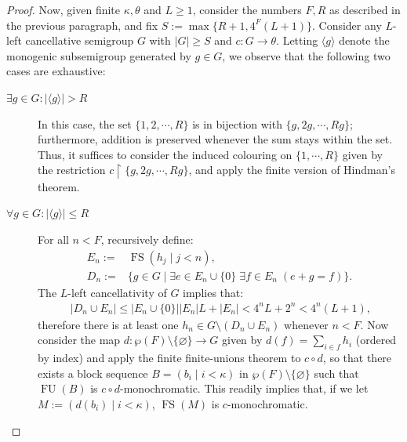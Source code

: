 \documentclass{amsart}
\theoremstyle{definition}
\theoremstyle{remark}
\numberwithin{equation}{section}
\begin{document}
\begin{proof}
    Now, given finite $\kappa, \theta$ and $L\geq1$, consider the numbers $F, R$ as described in the previous paragraph, and fix $S:=\max\{R+1, 4^{F}(L+1)\}$.
    Consider any $L$-left cancellative semigroup $G$ with $|G|\geq S$ and $c:G\longrightarrow\theta$. Letting $\langle g\rangle$ denote the monogenic subsemigroup generated by $g\in G$, we observe that the following two cases are exhaustive:
    \begin{description}
        \item[$\exists g\in G:|\langle g\rangle|>R$]
            In this case, the set $\{1, 2, \cdots, R\}$ is in bijection with $\{g, 2g, \cdots, Rg\}$; furthermore, addition is preserved whenever the sum stays within the set. Thus, it suffices to consider the induced colouring on $\{1,\cdots,R\}$ given by the restriction $c\upharpoonright\{g,2g,\cdots,Rg\}$, and apply the finite version of Hindman's theorem.
        \item[$\forall g\in G:|\langle g\rangle|\leq R$] 
            For all $n<F$, recursively define:
            \begin{align*}
                E_{n}:=&\operatorname{FS}(h_{j}\mid j<n),\\
                D_{n}:=&\{g\in G\mid\exists e\in E_{n}\cup\{0\}\;\exists f\in E_{n}\;(e+g=f)\}.
            \end{align*}
            The $L$-left cancellativity of $G$ implies that:
            \begin{align*}\;
                |D_{n}\cup E_{n}|\leq
                |E_{n}\cup\{0\}||E_n|L+|E_n|<
                4^{n}L+2^{n}<
                4^{n}(L+1),
            \end{align*}
            therefore there is at least one $h_{n}\in G\setminus(D_{n}\cup E_{n})$ whenever $n<F$.
            Now consider the map $d:\wp(F)\setminus\{\varnothing\}\to G$ given by $d(f)=\sum_{i\in f}h_{i}$ (ordered by index) and apply the finite finite-unions theorem to $c\circ d$, so that there exists a block sequence $B=(b_{i}\mid i<\kappa)$ in $\wp(F)\setminus\{\varnothing\}$ such that $\operatorname{FU}(B)$ is $c\circ d$-monochromatic. This readily implies that, if we let $M:=(d(b_{i})\mid i<\kappa)$, $\operatorname{FS}(M)$ is $c$-monochromatic. \qedhere
    \end{description}
\end{proof}


\end{document}
